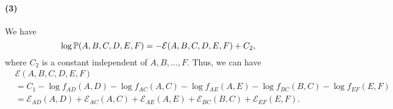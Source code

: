\documentclass[a4 paper,12pt]{article}
\begin{document}
\paragraph*{(3)}
We have
\[
\log \mathbb{P}(A,B,C,D,E,F)=-\mathcal{E}(A,B,C,D,E,F)+C_2,	
\] where $C_2$ is a constant independent of $A,B,...,F$. Thus, we can have
\begin{align*}
&\mathcal{E}(A,B,C,D,E,F)\\
&=C_1-\log f_{AD}(A,D)-\log f_{AC}(A,C)-\log f_{AE}(A,E)-\log f_{BC}(B,C)-\log f_{EF}(E,F)\\
&=\mathcal{E}_{AD}(A,D)+\mathcal{E}_{AC}(A,C)+\mathcal{E}_{AE}(A,E)+\mathcal{E}_{BC}(B,C)+\mathcal{E}_{EF}(E,F).
\end{align*}

\end{document}
